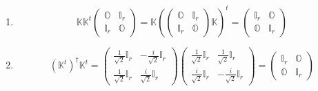 \documentclass[aps, preprint]{revtex4}
\begin{document}
\begin{enumerate}
\item
\begin{equation}\mathbb{K} \mathbb{K}^{t} \left (\begin{array}{cc}\mathbb{O} & \mathbb{I}_{r} \\
\mathbb{I}_{r} & \mathbb{O}\end{array}\right ) =\mathbb{K} \left (\left (\begin{array}{cc}\mathbb{O} & \mathbb{I}_{r} \\
\mathbb{I}_{r} & \mathbb{O}\end{array}\right ) \mathbb{K}\right )^{t} =\left (\begin{array}{cc}\mathbb{I}_{r} & \mathbb{O} \\
\mathbb{O} & \mathbb{I}_{r}\end{array}\right )
\end{equation}

\item
\begin{equation}\left (\mathbb{K}^{t}\right )^{ \dag } \mathbb{K}^{t} =\left (\begin{array}{cc}\frac{1}{\sqrt{2}} \mathbb{I}_{r} &  -\frac{i}{\sqrt{2}} \mathbb{I}_{r} \\
\frac{1}{\sqrt{2}} \mathbb{I}_{r} & \frac{i}{\sqrt{2}} \mathbb{I}_{r}\end{array}\right ) \left (\begin{array}{cc}\frac{1}{\sqrt{2}} \mathbb{I}_{r} & \frac{1}{\sqrt{2}} \mathbb{I}_{r} \\
\frac{i}{\sqrt{2}} \mathbb{I}_{r} &  -\frac{i}{\sqrt{2}} \mathbb{I}_{r}\end{array}\right ) =\left (\begin{array}{cc}\mathbb{I}_{r} & \mathbb{O} \\
\mathbb{O} & \mathbb{I}_{r}\end{array}\right )
\end{equation}\end{enumerate}
\end{document}
